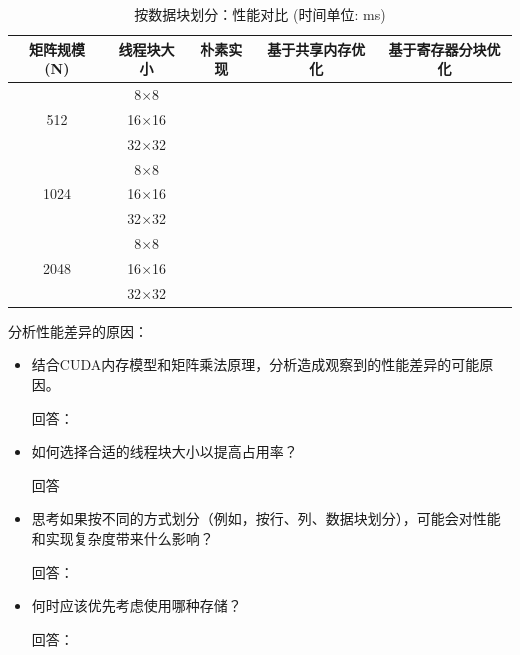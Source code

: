 \documentclass{SYSUReport}
\begin{document}
\begin{table}[H] %
\centering
\caption{按数据块划分：性能对比 (时间单位: ms)}
\label{tab:perf_tile}
\begin{tabular}{|c|c|c|c|c|}
\hline
矩阵规模 (N) & 线程块大小 & 朴素实现 & 基于共享内存优化 & 基于寄存器分块优化 \\
\hline
\multirow{3}{*}{512} & 8$\times$8 &       &       &       \\ %
\cline{2-5}
& 16$\times$16 &       &       &       \\
\cline{2-5}
& 32$\times$32 &       &       &       \\
\hline
\multirow{3}{*}{1024} & 8$\times$8 &       &       &       \\
\cline{2-5}
& 16$\times$16 &       &       &       \\
\cline{2-5}
& 32$\times$32 &       &       &       \\
\hline
\multirow{3}{*}{2048} & 8$\times$8 &       &       &       \\
\cline{2-5}
& 16$\times$16 &       &       &       \\
\cline{2-5}
& 32$\times$32 &       &       &       \\
\hline
\end{tabular}
\end{table}
分析性能差异的原因：
\begin{itemize}
    \item 结合CUDA内存模型和矩阵乘法原理，分析造成观察到的性能差异的可能原因。\par
    回答：
    \item 如何选择合适的线程块大小以提高占用率？\par
    回答
    \item 思考如果按不同的方式划分（例如，按行、列、数据块划分），可能会对性能和实现复杂度带来什么影响？\par
    回答：
    \item 何时应该优先考虑使用哪种存储？\par
    回答：


\end{itemize}
\end{document}
